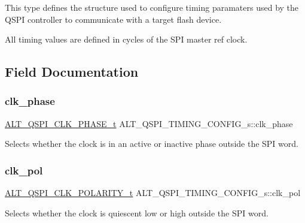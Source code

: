 This type defines the structure used to configure timing paramaters used by the Q\+S\+PI controller to communicate with a target flash device.

All timing values are defined in cycles of the S\+PI master ref clock. 

\subsection{Field Documentation}
\mbox{\label{structALT__QSPI__TIMING__CONFIG__s_af06ef74dd2a0472fcb662da3f8f6fc67}} 
\subsubsection{\texorpdfstring{clk\_phase}{clk\_phase}}
{\footnotesize\ttfamily \mbox{\hyperlink{group__ALT__QSPI__DEV__CFG_ga96e07c567fa1c448c58c463c4068a136}{A\+L\+T\+\_\+\+Q\+S\+P\+I\+\_\+\+C\+L\+K\+\_\+\+P\+H\+A\+S\+E\+\_\+t}} A\+L\+T\+\_\+\+Q\+S\+P\+I\+\_\+\+T\+I\+M\+I\+N\+G\+\_\+\+C\+O\+N\+F\+I\+G\+\_\+s\+::clk\+\_\+phase}

Selects whether the clock is in an active or inactive phase outside the S\+PI word. \mbox{\label{structALT__QSPI__TIMING__CONFIG__s_ae0d5397b2c9b15e685afaf15f41eadad}} 
\subsubsection{\texorpdfstring{clk\_pol}{clk\_pol}}
{\footnotesize\ttfamily \mbox{\hyperlink{group__ALT__QSPI__DEV__CFG_ga4255485b5b3ba0a98cb3294b3bebbc8f}{A\+L\+T\+\_\+\+Q\+S\+P\+I\+\_\+\+C\+L\+K\+\_\+\+P\+O\+L\+A\+R\+I\+T\+Y\+\_\+t}} A\+L\+T\+\_\+\+Q\+S\+P\+I\+\_\+\+T\+I\+M\+I\+N\+G\+\_\+\+C\+O\+N\+F\+I\+G\+\_\+s\+::clk\+\_\+pol}

Selects whether the clock is quiescent low or high outside the S\+PI word. \mbox{\label{structALT__QSPI__TIMING__CONFIG__s_a1b408b90b0557dc6ace91c4b583a65d7}} 
